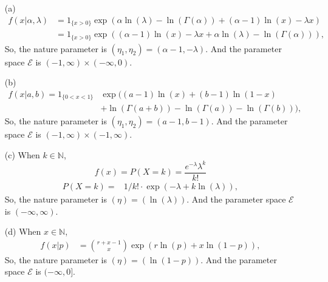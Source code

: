 \documentclass[12pt]{article}
\begin{document}
    \begin{solution}
        \begin{itemize}
            \item[(a)]
            \[
                \begin{aligned}
                    f(x|\alpha, \lambda)&=1_{\{x>0\}}\exp(\alpha\ln(\lambda)-\ln(\Gamma(\alpha))+(\alpha-1)\ln(x)-\lambda x)\\
                    &=1_{\{x>0\}}\exp((\alpha-1)\ln(x)-\lambda x+\alpha\ln(\lambda)-\ln(\Gamma(\alpha))), 
                \end{aligned}
            \]
            So, the nature parameter is $(\eta_1,\eta_2)=(\alpha-1, -\lambda)$. And the parameter space \(\mathcal{E}\) is \((-1,\infty)\times(-\infty,0)\). 
            \item[(b)] 
            \[
                \begin{aligned}
                    f(x|a,b)=1_{\{0<x<1\}}&\exp((a-1)\ln(x)+(b-1)\ln(1-x)\\&+\ln(\Gamma(a+b))-\ln(\Gamma(a))-\ln(\Gamma(b))), 
                \end{aligned}
            \] 
            So, the nature parameter is $(\eta_1,\eta_2)=(a-1, b-1)$. And the parameter space \(\mathcal{E}\) is \((-1,\infty)\times(-1,\infty)\). 
            \item[(c)] When \(k\in\mathbb{N}\), 
            \[
                f(x)=P(X=k)=\frac{e^{-\lambda}\lambda^k}{k!}
            \]
            \[
                \begin{aligned}
                    P(X=k)=&1/k!\cdot\exp(-\lambda+k\ln(\lambda)), 
                \end{aligned}
            \]
            So, the nature parameter is $(\eta)=(\ln(\lambda))$. And the parameter space \(\mathcal{E}\) is \((-\infty,\infty)\). 
            \item[(d)] When \(x\in\mathbb{N}\), 
            \[
                \begin{aligned}
                    f(x|p)&=\binom{r+x-1}{x}\exp\left(r\ln(p)+x\ln(1-p)\right), 
                \end{aligned}
            \]
            So, the nature parameter is $(\eta)=(\ln(1-p))$. And the parameter space \(\mathcal{E}\) is \((-\infty,0]\). 
        \end{itemize}
    \end{solution}
\end{document}
